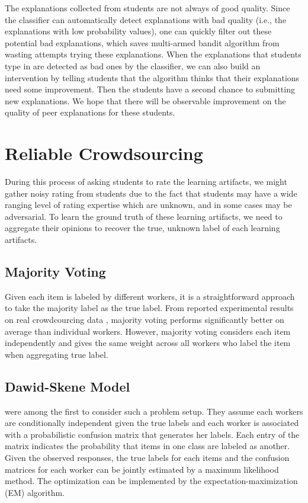 \documentclass{article}
\begin{document}
The explanations collected from students are not always of good
quality. Since the classifier can automatically detect explanations
with bad quality (i.e., the explanations with low probability values),
one can quickly filter out these potential bad explanations, which
saves multi-armed bandit algorithm from wasting attempts trying these
explanations. When the explanations
that students type in are detected as bad ones by the classifier, we
can also build an intervention by
telling students that the algorithm thinks that their explanations
need some improvement. Then the students have a second chance to
submitting new explanations. We hope that there will be observable
improvement on the quality of peer explanations for these students.

\section{Reliable Crowdsourcing}
During this process of asking
students to rate the learning artifacts, we might
gather noisy rating from students due to the fact that students may
have a wide ranging level of rating expertise which are unknown, and
in some cases may be adversarial. To learn the ground truth of these
learning artifacts, we need to aggregate their opinions to recover the
true, unknown label of each learning artifacts.

\subsection{Majority Voting}
Given each item is labeled by different workers, it is a
straightforward approach to take the majority label as the true
label. From reported experimental results on real crowdcourcing data
\cite{Snow2008-rm}, majority voting performs significantly better on
average than individual workers. However, majority voting considers
each item independently and gives the same weight across all workers
who label the item when aggregating true label.

\subsection{Dawid-Skene Model}
\cite{dawid1979maximum} were among the first to consider such a
problem setup. They assume each workers are conditionally independent
given the true labels and each worker is associated with a
probabilistic confusion matrix that generates her labels. Each entry
of the matrix indicates the probability that items in one class are
labeled as another. Given the
observed responses, the true labels for each items and the confusion
matrices for each worker can be jointly estimated by a maximum
likelihood method. The optimization can be implemented by the
expectation-maximization (EM) algorithm.
\end{document}
